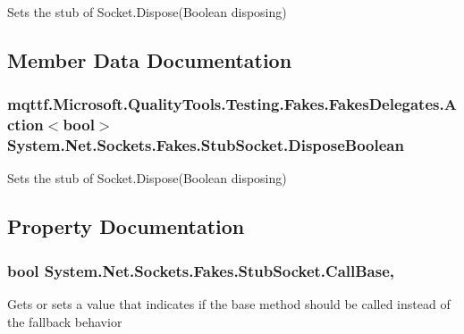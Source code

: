 Sets the stub of Socket.\-Dispose(\-Boolean disposing)



\subsection{Member Data Documentation}
\hypertarget{class_system_1_1_net_1_1_sockets_1_1_fakes_1_1_stub_socket_a7a770dfc5638c1feee0f5ce54d6ef5f0}{
\subsubsection[{Dispose\-Boolean}]{\setlength{\rightskip}{0pt plus 5cm}mqttf.\-Microsoft.\-Quality\-Tools.\-Testing.\-Fakes.\-Fakes\-Delegates.\-Action$<$bool$>$ System.\-Net.\-Sockets.\-Fakes.\-Stub\-Socket.\-Dispose\-Boolean}}\label{class_system_1_1_net_1_1_sockets_1_1_fakes_1_1_stub_socket_a7a770dfc5638c1feee0f5ce54d6ef5f0}


Sets the stub of Socket.\-Dispose(\-Boolean disposing)



\subsection{Property Documentation}
\hypertarget{class_system_1_1_net_1_1_sockets_1_1_fakes_1_1_stub_socket_a2c061a99bbf773d8556d6291180624c1}{
\subsubsection[{Call\-Base}]{\setlength{\rightskip}{0pt plus 5cm}bool System.\-Net.\-Sockets.\-Fakes.\-Stub\-Socket.\-Call\-Base\hspace{0.3cm}{\ttfamily [get]}, {\ttfamily [set]}}}\label{class_system_1_1_net_1_1_sockets_1_1_fakes_1_1_stub_socket_a2c061a99bbf773d8556d6291180624c1}


Gets or sets a value that indicates if the base method should be called instead of the fallback behavior

